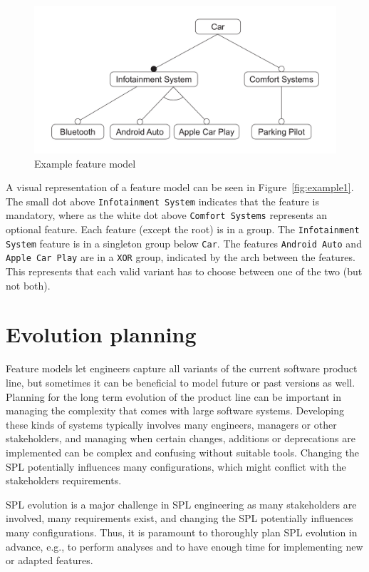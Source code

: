 \documentclass[a4paper,english]{ifimaster}
\begin{document}
\begin{figure}[htpb]
	\centering
	\includegraphics[width=0.8\linewidth]{illustrations/example.pdf}
	\caption{Example feature model}%
	\label{fig:example1}
\end{figure}

A visual representation of a feature model can be seen in Figure~\vref{fig:example1}. The small dot above \texttt{Infotainment System} indicates that the feature is mandatory, where as the white dot above \texttt{Comfort Systems} represents an optional feature. Each feature (except the root) is in a group. The \texttt{Infotainment System} feature is in a singleton group below \texttt{Car}. The features \texttt{Android Auto} and \texttt{Apple Car Play} are in a \texttt{XOR} group, indicated by the arch between the features. This represents that each valid variant has to choose between one of the two (but not both).

\section{Evolution planning}%
\label{sec:evolution_planning}

Feature models let engineers capture all variants of the current software product line, but sometimes it can be beneficial to model future or past versions as well. Planning for the long term evolution of the product line can be important in managing the complexity that comes with large software systems. Developing these kinds of systems typically involves many engineers, managers or other stakeholders, and managing when certain changes, additions or deprecations are implemented can be complex and confusing without suitable tools. Changing the SPL potentially influences many configurations, which might conflict with the stakeholders requirements.

SPL evolution is a major challenge in SPL engineering as many stakeholders are involved, many requirements exist, and changing the SPL potentially influences many configurations. Thus, it is paramount to thoroughly plan SPL evolution in advance, e.g., to perform analyses and to have enough time for implementing new or adapted features.
\end{document}
